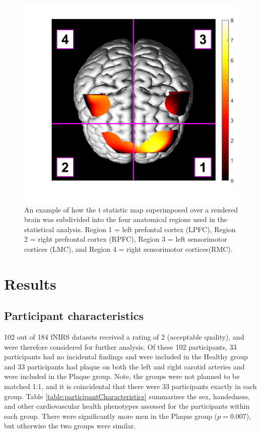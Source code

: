 \documentclass[12pt]{spieman}  %
\begin{document}
\begin{spacing}{2}
\begin{figure}
\begin{center}
\includegraphics[width = \linewidth]{Fig2_TmapRegions.jpg}
\end{center}
\caption 
{\label{fig:TmapRegions} An example of how the t statistic map superimposed over a rendered brain was subdivided into the four anatomical regions used in the statistical analysis. Region 1 = left prefontal cortex (LPFC), Region 2 = right prefrontal cortex (RPFC), Region 3 = left sensorimotor cortices (LMC), and Region 4 = right sensorimotor cortices(RMC).} 
\end{figure} 


\section{Results}
\subsection{Participant characteristics}
102 out of 184 fNIRS datasets received a rating of 2 (acceptable quality), and were therefore considered for further analysis. Of these 102 participants, 33 participants had no incidental findings and were included in the Healthy group and 33 participants had plaque on both the left and right carotid arteries and were included in the Plaque group. Note, the groups were not planned to be matched 1:1, and it is coincidental that there were 33 participants exactly in each group. Table \ref{table:participantCharacteristics} summarizes the sex, handedness, and other cardiovascular health phenotypes assessed for the participants within each group. There were significantly more men in the Plaque group ($p = 0.007$), but otherwise the two groups were similar. 


\end{spacing}
\end{document}
